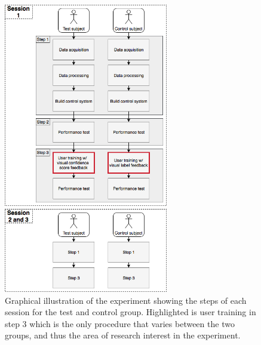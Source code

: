 \begin{figure}[H]                                         
	\includegraphics[width=0.64\textwidth]{figures/pMethods/OLDStudy_design}  
	\caption{Graphical illustration of the experiment showing the steps of each session for the test and control group. Highlighted is user training in step 3 which is the only procedure that varies between the two groups, and thus the area of research interest in the experiment.}
	\label{fig:std} 
\end{figure}   
